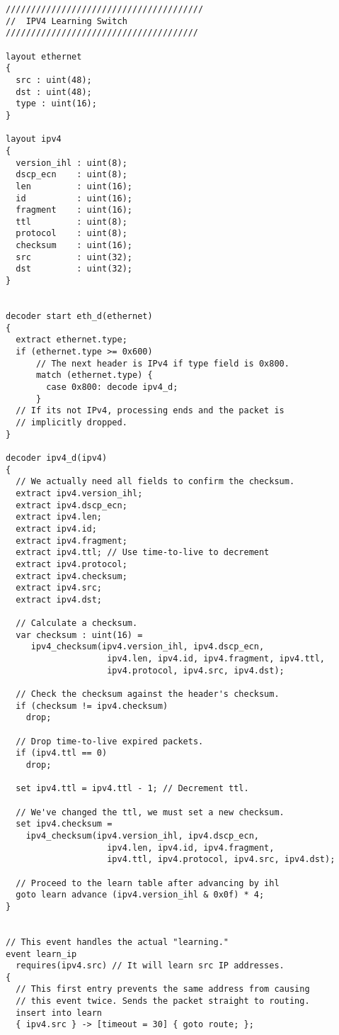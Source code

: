 \begin{lstlisting}
///////////////////////////////////////
//  IPV4 Learning Switch
//////////////////////////////////////

layout ethernet
{
  src : uint(48);
  dst : uint(48);
  type : uint(16);
}

layout ipv4
{
  version_ihl : uint(8);
  dscp_ecn    : uint(8);
  len         : uint(16);
  id          : uint(16);
  fragment    : uint(16);
  ttl         : uint(8);
  protocol    : uint(8);
  checksum    : uint(16);
  src         : uint(32);
  dst         : uint(32);
}


decoder start eth_d(ethernet)
{
  extract ethernet.type;
  if (ethernet.type >= 0x600)
      // The next header is IPv4 if type field is 0x800.
      match (ethernet.type) {
        case 0x800: decode ipv4_d;
      }
  // If its not IPv4, processing ends and the packet is
  // implicitly dropped.
}

decoder ipv4_d(ipv4)
{
  // We actually need all fields to confirm the checksum.
  extract ipv4.version_ihl;
  extract ipv4.dscp_ecn;
  extract ipv4.len;
  extract ipv4.id;
  extract ipv4.fragment;
  extract ipv4.ttl; // Use time-to-live to decrement
  extract ipv4.protocol;
  extract ipv4.checksum;
  extract ipv4.src;
  extract ipv4.dst;

  // Calculate a checksum.
  var checksum : uint(16) =
     ipv4_checksum(ipv4.version_ihl, ipv4.dscp_ecn, 
     				ipv4.len, ipv4.id, ipv4.fragment, ipv4.ttl, 
     				ipv4.protocol, ipv4.src, ipv4.dst);

  // Check the checksum against the header's checksum.
  if (checksum != ipv4.checksum)
    drop;

  // Drop time-to-live expired packets.
  if (ipv4.ttl == 0)
    drop;

  set ipv4.ttl = ipv4.ttl - 1; // Decrement ttl.

  // We've changed the ttl, we must set a new checksum.
  set ipv4.checksum =
    ipv4_checksum(ipv4.version_ihl, ipv4.dscp_ecn, 
    				ipv4.len, ipv4.id, ipv4.fragment, 
    				ipv4.ttl, ipv4.protocol, ipv4.src, ipv4.dst);

  // Proceed to the learn table after advancing by ihl
  goto learn advance (ipv4.version_ihl & 0x0f) * 4;
}


// This event handles the actual "learning."
event learn_ip
  requires(ipv4.src) // It will learn src IP addresses.
{
  // This first entry prevents the same address from causing
  // this event twice. Sends the packet straight to routing.
  insert into learn
  { ipv4.src } -> [timeout = 30] { goto route; };


\end{lstlisting}
